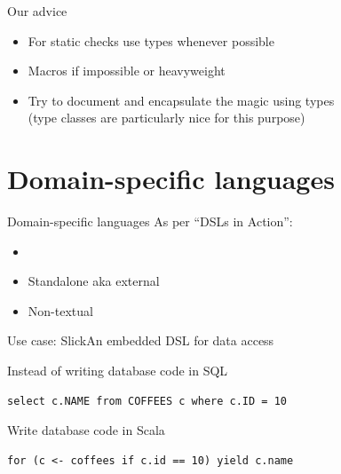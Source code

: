 \documentclass{beamer}
\begin{document}

\begin{frame}{Our advice}
  \begin{itemize}
  \item For static checks use types whenever possible
  \item Macros if impossible or heavyweight
  \item Try to document and encapsulate the magic using types\\
        (type classes are particularly nice for this purpose)
  \end{itemize}
\end{frame}

  \section{Domain-specific languages}

\begin{frame}{Domain-specific languages}
  As per ``DSLs in Action'':
  \begin{itemize}
  \item {}
  \item Standalone aka external
  \item Non-textual
  \end{itemize}
\end{frame}

\begin{frame}[fragile]{Use case: Slick}{An embedded DSL for data access}
  \vspace{1em}
  \begin{alertblock}{Instead of writing database code in SQL}
    \begin{verbatim}
select c.NAME from COFFEES c where c.ID = 10
    \end{verbatim}
  \end{alertblock}

  \vspace{1em}
  \begin{exampleblock}{Write database code in Scala}
    \begin{verbatim}
for (c <- coffees if c.id == 10) yield c.name
    \end{verbatim}
  \end{exampleblock}
\end{frame}
\end{document}
